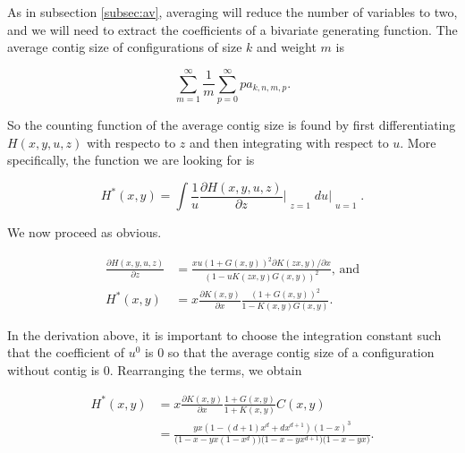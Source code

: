 \documentclass{article}
\begin{document}
As in subsection \ref{subsec:av}, averaging will reduce the number of
variables to two, and we will need to extract the coefficients of a
bivariate generating function. The average contig size of configurations
of size $k$ and weight $m$ is

\begin{equation*}
\sum_{m=1}^\infty\frac{1}{m}\sum_{p=0}^\infty pa_{k,n,m,p}.
\end{equation*}

So the counting function of the average contig size is found by first
differentiating $H(x,y,u,z)$ with respecto to $z$ and then integrating
with respect to $u$. More specifically, the function we are looking for is

\begin{equation*}
H^*(x,y) = \int \frac{1}{u}
\frac{\partial H(x,y,u,z)}{\partial z}\Bigr|_{\substack{\\z=1}} du
\biggr|_{\substack{\\u=1}}.
\end{equation*}

We now proceed as obvious.

\begin{equation*}
\begin{split}
\frac{\partial H(x,y,u,z)}{\partial z} &=
\frac{xu\left(1+G(x,y)\right)^2 \partial K(zx,y)/ \partial x}
{\left(1-uK(zx,y)G(x,y)\right)^2} \text{, and} \\
H^*(x,y) &=  x \frac{\partial K(x,y)}{\partial x}
\frac{\left(1+G(x,y)\right)^2}{1-K(x,y)G(x,y)}.
\end{split}
\end{equation*}

In the derivation above, it is important to choose the integration
constant such that the coefficient of $u^0$ is $0$ so that the average
contig size of a configuration without contig is $0$. Rearranging the
terms, we obtain

\begin{equation*}
\begin{split}
H^*(x,y) &= x \frac{\partial K(x,y)}{\partial x}
\frac{1+G(x,y)}{1+K(x,y)}C(x,y) \\
&= \frac{yx(1-(d+1)x^d+dx^{d+1})(1-x)^3}
{\big(1-x-yx(1-x^d)\big)\big(1-x-yx^{d+1}\big)\big(1-x-yx\big)}.
\end{split}
\end{equation*}
\end{document}
